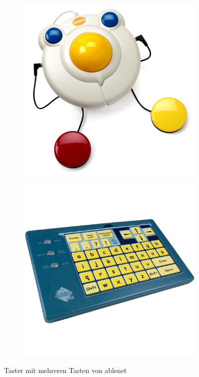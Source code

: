 \begin{figure}[H]
\begin{subfigure}{.33\textwidth}
				\end{subfigure}%
				\begin{subfigure}{.33\textwidth}
  					\centering
  					\includegraphics[width=.8\linewidth]{images/buttonsMouse.png}
  					\caption{\cite{ablenet:mouse}}
				\end{subfigure}
                \begin{subfigure}{.33\textwidth}
  					\centering
  					\includegraphics[width=.8\linewidth]{images/buttonsKeyboard.png}
  					\caption{\cite{ablenet:keyboard}}
				\end{subfigure}
                \caption{Taster mit mehreren Tasten von ablenet}
				\label{fig:ablenetMultipleButtons}
			\end{figure}
            

